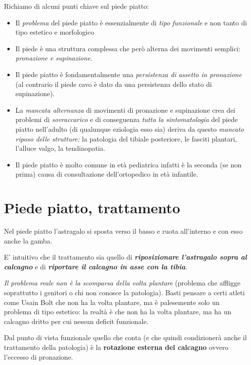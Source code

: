 Richiamo di alcuni punti chiave sul piede piatto:

\begin{itemize}
\item
  Il \emph{problema} del piede piatto è essenzialmente di \emph{tipo} \emph{funzionale} e non tanto di tipo estetico e morfologico
\item
  Il piede è una struttura complessa che però alterna dei movimenti semplici: \emph{pronazione e supinazione.}
\item
  Il piede piatto è fondamentalmente una \emph{persistenza di assetto in pronazione} (al contrario il piede cavo è dato da una persistenza dello stato di supinazione).
\item
  La \emph{mancata alternanza} di movimenti di pronazione e supinazione crea dei problemi di \emph{sovraccarico} e di conseguenza \emph{tutta la sintomatologia} del piede piatto nell'adulto (di qualunque eziologia esso sia) deriva da questo \emph{mancato riposo delle strutture:} la patologia del tibiale posteriore, le fasciti plantari, l'alluce valgo, la tendinopatia.
\item
  Il piede piatto è molto comune in età pediatrica infatti è la seconda (se non prima) causa di consultazione dell'ortopedico in età infantile.
\end{itemize}

\section{Piede piatto, trattamento}

Nel piede piatto l'astragalo si sposta verso il basso e ruota all'interno e con esso anche la gamba.

E' intuitivo che il trattamento sia quello di \textbf{\emph{riposizionare l'astragalo sopra al calcagno}} e di \textbf{\emph{riportare il calcagno in asse con la tibia}}.

\emph{Il problema reale non è la scomparsa della volta plantare} (problema che affligge soprattutto i genitori o chi non conosce la patologia). Basti pensare a certi atleti come Usain Bolt che non ha la volta plantare, ma è palesemente solo un problema di tipo estetico: la realtà è che non ha la volta plantare, ma ha un calcagno dritto per cui nessun deficit funzionale.

Dal punto di vista funzionale quello che conta (e che quindi condizionerà anche il trattamento della patologia) è la \textbf{rotazione esterna del calcagno} ovvero l'eccesso di pronazione.

